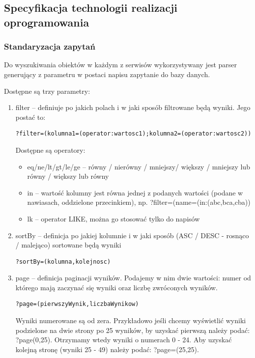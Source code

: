 \documentclass[11pt,a4paper,twoside]{article}
\begin{document}
\subsection{Specyfikacja technologii realizacji oprogramowania}

\subsubsection{Standaryzacja zapytań}
\label{stdZapytan}
Do wyszukiwania obiektów w każdym z serwisów wykorzystywany jest parser generujący z parametru w postaci napisu zapytanie do bazy danych.

Dostępne są trzy parametry:
\begin{enumerate}
\item filter -- definiuje po jakich polach i w jaki sposób filtrowane będą wyniki. Jego postać to:
\begin{lstlisting}
?filter=(kolumna1=(operator:wartosc1);kolumna2=(operator:wartosc2))
\end{lstlisting}
\vspace{-20pt}
Dostępne są operatory:
\begin{itemize}
\item eq/ne/lt/gt/le/ge -- równy / nierówny / mniejszy/ większy / mniejszy lub równy / większy lub równy
\item in -- wartość kolumny jest równa jednej z podanych wartości (podane w nawiasach, oddzielone przecinkiem), np. ?filter=(name=(in:(abc,bca,cba))
\item lk -- operator LIKE, można go stosować tylko do napisów
\end{itemize}

\item sortBy -- definicja po jakiej kolumnie i w jaki sposób (ASC / DESC - rosnąco / malejąco) sortowane będą wyniki
\begin{lstlisting}
?sortBy=(kolumna,kolejnosc)
\end{lstlisting}
\vspace{-20pt}

\item page -- definicja paginacji wyników. Podajemy w nim dwie wartości: numer od którego mają zaczynać się wyniki oraz liczbę zwróconych wyników.

\begin{lstlisting}
?page=(pierwszyWynik,liczbaWynikow)
\end{lstlisting}
\vspace{-20pt}

Wyniki numerowane są od zera. Przykładowo jeśli chcemy wyświetlić wyniki podzielone na dwie strony po 25 wyników, by uzyskać pierwszą należy podać: ?page(0,25). Otrzymamy wtedy wyniki o numerach 0 - 24. Aby uzyskać kolejną stronę (wyniki 25 - 49) należy podać: ?page=(25,25).
\end{enumerate}
\end{document}
